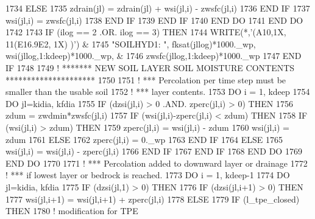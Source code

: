 \begin{DoxyCode}
1734           \textcolor{keywordflow}{ELSE}
1735             zdrain(jl) = zdrain(jl) + wsi(jl,i) - zwsfc(jl,i)
1736 \textcolor{keywordflow}{          END IF}
1737           wsi(jl,i) = zwsfc(jl,i)
1738 \textcolor{keywordflow}{        END IF}
1739 \textcolor{keywordflow}{      END IF}
1740 \textcolor{keywordflow}{    END DO}
1741 \textcolor{keywordflow}{  END DO}
1742 
1743   \textcolor{keywordflow}{IF} (ilog == 2 .OR. ilog == 3) \textcolor{keywordflow}{THEN}
1744     \textcolor{keyword}{WRITE}(*,\textcolor{stringliteral}{'(A10,1X, 11(E16.9E2, 1X) )'})  &
1745         \textcolor{stringliteral}{"SOILHYD1: "}, fksat(jllog)*1000.\_wp, wsi(jllog,1:kdeep)*1000.\_wp,  &
1746         zwsfc(jllog,1:kdeep)*1000.\_wp
1747 \textcolor{keywordflow}{  END IF}
1748 
1749 \textcolor{comment}{! ******* NEW SOIL LAYER SOIL MOISTURE CONTENTS *********************}
1750 
1751 \textcolor{comment}{! *** Percolation per time step must be smaller than the usable soil}
1752 \textcolor{comment}{! *** layer contents.}
1753   \textcolor{keywordflow}{DO} i = 1, kdeep
1754     \textcolor{keywordflow}{DO} jl=kidia, kfdia
1755       \textcolor{keywordflow}{IF} (dzsi(jl,i) > 0 .AND. zperc(jl,i) > 0) \textcolor{keywordflow}{THEN}
1756         zdum = zwdmin*zwsfc(jl,i)
1757         \textcolor{keywordflow}{IF} (wsi(jl,i)-zperc(jl,i) < zdum) \textcolor{keywordflow}{THEN}
1758           \textcolor{keywordflow}{IF} (wsi(jl,i) > zdum) \textcolor{keywordflow}{THEN}
1759             zperc(jl,i) = wsi(jl,i) - zdum
1760             wsi(jl,i) = zdum
1761           \textcolor{keywordflow}{ELSE}
1762             zperc(jl,i) = 0.\_wp
1763 \textcolor{keywordflow}{          END IF}
1764         \textcolor{keywordflow}{ELSE}
1765           wsi(jl,i) = wsi(jl,i) - zperc(jl,i)
1766 \textcolor{keywordflow}{        END IF}
1767 \textcolor{keywordflow}{      END IF}
1768 \textcolor{keywordflow}{    END DO}
1769 \textcolor{keywordflow}{  END DO}
1770 
1771 \textcolor{comment}{! *** Percolation added to downward layer or drainage}
1772 \textcolor{comment}{! *** if lowest layer or bedrock is reached.}
1773   \textcolor{keywordflow}{DO} i = 1, kdeep-1
1774     \textcolor{keywordflow}{DO} jl=kidia, kfdia
1775       \textcolor{keywordflow}{IF} (dzsi(jl,1) > 0) \textcolor{keywordflow}{THEN}
1776         \textcolor{keywordflow}{IF} (dzsi(jl,i+1) > 0) \textcolor{keywordflow}{THEN}
1777           wsi(jl,i+1) = wsi(jl,i+1) + zperc(jl,i)
1778         \textcolor{keywordflow}{ELSE}
1779           \textcolor{keywordflow}{IF} (l\_tpe\_closed) \textcolor{keywordflow}{THEN}
1780             \textcolor{comment}{! modification for TPE}

\end{DoxyCode}
